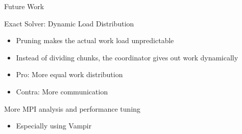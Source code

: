 
\begin{frame}{Future Work}
  \begin{block}{Exact Solver: Dynamic Load Distribution}
    \begin{itemize}
      \item Pruning makes the actual work load unpredictable
      \item Instead of dividing chunks, the coordinator gives out work dynamically
      \item Pro: More equal work distribution
      \item Contra: More communication
    \end{itemize}
  \end{block}
  \pause
  \begin{block}{More MPI analysis and performance tuning}
    \begin{itemize}
      \item Especially using Vampir
    \end{itemize}
  \end{block}
\end{frame}

